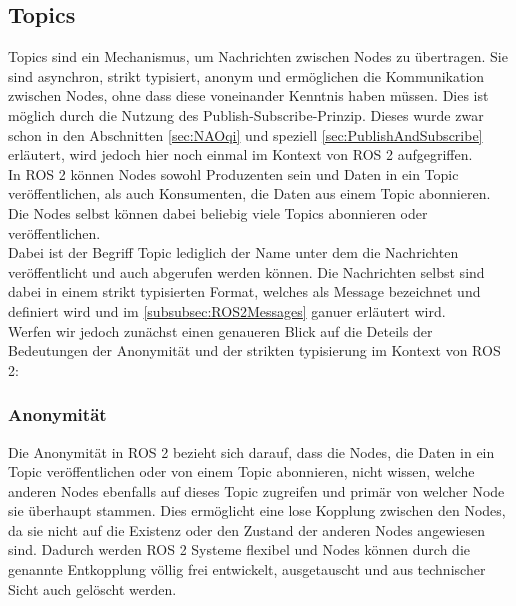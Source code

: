 \subsection{Topics}\label{subsec:ROS2Topics}
Topics sind ein Mechanismus, um Nachrichten zwischen Nodes zu übertragen. Sie sind asynchron, strikt typisiert, anonym und ermöglichen die Kommunikation zwischen Nodes, ohne dass diese voneinander Kenntnis haben müssen. Dies ist möglich durch die Nutzung des Publish-Subscribe-Prinzip. Dieses wurde zwar schon in den Abschnitten \autoref{sec:NAOqi} und speziell \autoref{sec:PublishAndSubscribe} erläutert, wird jedoch hier noch einmal im Kontext von \ac{ROS} 2 aufgegriffen.\\
In \ac{ROS} 2 können Nodes sowohl Produzenten sein und Daten in ein Topic veröffentlichen, als auch Konsumenten, die Daten aus einem Topic abonnieren. Die Nodes selbst können dabei beliebig viele Topics abonnieren oder veröffentlichen.\\
Dabei ist der Begriff Topic lediglich der Name unter dem die Nachrichten veröffentlicht und auch abgerufen werden können. Die Nachrichten selbst sind dabei in einem strikt typisierten Format, welches als Message bezeichnet und definiert wird und im \autoref{subsubsec:ROS2Messages} ganuer erläutert wird.\\
Werfen wir jedoch zunächst einen genaueren Blick auf die Deteils der Bedeutungen der Anonymität und der strikten typisierung im Kontext von \ac{ROS} 2:\\

\subsubsection{Anonymität}\label{subsubsec:ROS2Anonymitaet}
Die Anonymität in \ac{ROS} 2 bezieht sich darauf, dass die Nodes, die Daten in ein Topic veröffentlichen oder von einem Topic abonnieren, nicht wissen, welche anderen Nodes ebenfalls auf dieses Topic zugreifen und primär von welcher Node sie überhaupt stammen. Dies ermöglicht eine lose Kopplung zwischen den Nodes, da sie nicht auf die Existenz oder den Zustand der anderen Nodes angewiesen sind. Dadurch werden \ac{ROS} 2 Systeme flexibel und Nodes können durch die genannte Entkopplung völlig frei entwickelt, ausgetauscht und aus technischer Sicht auch gelöscht werden.\\

